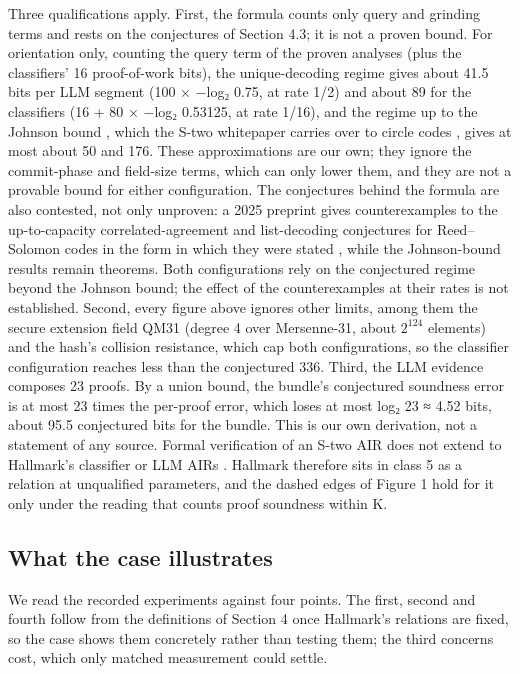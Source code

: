 \documentclass[11pt]{article}
\begin{document}
Three qualifications apply. First, the formula counts only query and grinding terms and rests on the conjectures of Section 4.3; it is not a proven bound. For orientation only, counting the query term of the proven analyses (plus the classifiers' 16 proof-of-work bits), the unique-decoding regime gives about 41.5 bits per LLM segment (100 × −log₂ 0.75, at rate 1/2) and about 89 for the classifiers (16 + 80 × −log₂ 0.53125, at rate 1/16), and the regime up to the Johnson bound \cite{A40}, which the S-two whitepaper carries over to circle codes \cite{A46}, gives at most about 50 and 176. These approximations are our own; they ignore the commit-phase and field-size terms, which can only lower them, and they are not a provable bound for either configuration. The conjectures behind the formula are also contested, not only unproven: a 2025 preprint gives counterexamples to the up-to-capacity correlated-agreement and list-decoding conjectures for Reed--Solomon codes in the form in which they were stated \cite{A47}, while the Johnson-bound results remain theorems. Both configurations rely on the conjectured regime beyond the Johnson bound; the effect of the counterexamples at their rates is not established. Second, every figure above ignores other limits, among them the secure extension field QM31 (degree 4 over Mersenne-31, about \ensuremath{2^{124}} elements) and the hash's collision resistance, which cap both configurations, so the classifier configuration reaches less than the conjectured 336. Third, the LLM evidence composes 23 proofs. By a union bound, the bundle's conjectured soundness error is at most 23 times the per-proof error, which loses at most log₂ 23 ≈ 4.52 bits, about 95.5 conjectured bits for the bundle. This is our own derivation, not a statement of any source. Formal verification of an S-two AIR does not extend to Hallmark's classifier or LLM AIRs \cite{A30}. Hallmark therefore sits in class 5 as a relation at unqualified parameters, and the dashed edges of Figure 1 hold for it only under the reading that counts proof soundness within K.

\subsection{What the case illustrates}

We read the recorded experiments against four points. The first, second and fourth follow from the definitions of Section 4 once Hallmark's relations are fixed, so the case shows them concretely rather than testing them; the third concerns cost, which only matched measurement could settle.
\end{document}
